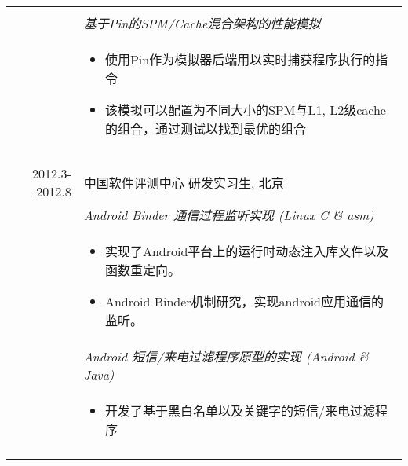 \documentclass[a4paper,10pt]{article} %
\begin{document}
\begin{tabular}{r|p{11cm}}
\multicolumn{2}{c}{} \\
& \emph{基于Pin的SPM/Cache混合架构的性能模拟}\\
& \footnotesize{
\begin{itemize}
\item 使用Pin作为模拟器后端用以实时捕获程序执行的指令
\item 该模拟可以配置为不同大小的SPM与L1, L2级cache的组合，通过测试以找到最优的组合
\end{itemize}
}\\




\multicolumn{2}{c}{} \\

\multicolumn{2}{c}{} \\
\textsc{2012.3-2012.8} & \textsc{中国软件评测中心} 研发实习生, 北京 \emph{}\smallskip\smallskip\\
& \emph{Android Binder 通信过程监听实现 (Linux C \& asm)}\\
& \footnotesize{
\begin{itemize}
\item 实现了Android平台上的运行时动态注入库文件以及函数重定向。
\item Android Binder机制研究，实现android应用通信的监听。
\end{itemize}
}\\
& \emph{Android 短信/来电过滤程序原型的实现 (Android \& Java)}\\
& \footnotesize{
  \begin{itemize}
  \item 开发了基于黑白名单以及关键字的短信/来电过滤程序
  \end{itemize}
}\\
\multicolumn{2}{c}{} \\
\end{tabular}
\end{document}
